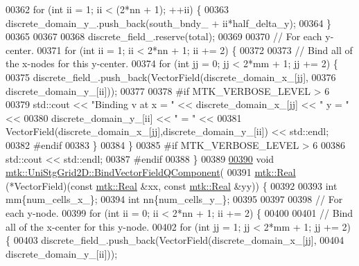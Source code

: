 \begin{DoxyCode}
00362   \textcolor{keywordflow}{for} (\textcolor{keywordtype}{int} ii = 1; ii < (2*nn + 1); ++ii) \{
00363     discrete\_domain\_y\_.push\_back(south\_bndy\_ + ii*half\_delta\_y);
00364   \}
00365 
00367 
00368   discrete\_field\_.reserve(total);
00369 
00370   \textcolor{comment}{// For each y-center.}
00371   \textcolor{keywordflow}{for} (\textcolor{keywordtype}{int} ii = 1; ii < 2*nn + 1; ii += 2) \{
00372 
00373     \textcolor{comment}{// Bind all of the x-nodes for this y-center.}
00374     \textcolor{keywordflow}{for} (\textcolor{keywordtype}{int} jj = 0; jj < 2*mm + 1; jj += 2) \{
00375       discrete\_field\_.push\_back(VectorField(discrete\_domain\_x\_[jj],
00376                                             discrete\_domain\_y\_[ii]));
00377 
00378 \textcolor{preprocessor}{      #if MTK\_VERBOSE\_LEVEL > 6}
00379       std::cout << \textcolor{stringliteral}{"Binding v at x = "} << discrete\_domain\_x\_[jj] << \textcolor{stringliteral}{" y = "} <<
00380         discrete\_domain\_y\_[ii] << \textcolor{stringliteral}{" = "} <<
00381         VectorField(discrete\_domain\_x\_[jj],discrete\_domain\_y\_[ii]) << std::endl;
00382 \textcolor{preprocessor}{      #endif}
00383     \}
00384   \}
00385 \textcolor{preprocessor}{  #if MTK\_VERBOSE\_LEVEL > 6}
00386   std::cout << std::endl;
00387 \textcolor{preprocessor}{  #endif}
00388 \}
00389 
\hypertarget{mtk__uni__stg__grid__2d_8cc_source_l00390}{}\hyperlink{classmtk_1_1UniStgGrid2D_a9643167e149da2ea4e57fd12cb9f1a97}{00390} \textcolor{keywordtype}{void} \hyperlink{classmtk_1_1UniStgGrid2D_a9643167e149da2ea4e57fd12cb9f1a97}{mtk::UniStgGrid2D::BindVectorFieldQComponent}(
00391   \hyperlink{group__c01-roots_gac080bbbf5cbb5502c9f00405f894857d}{mtk::Real} (*VectorField)(\textcolor{keyword}{const} \hyperlink{group__c01-roots_gac080bbbf5cbb5502c9f00405f894857d}{mtk::Real} &xx, \textcolor{keyword}{const} 
      \hyperlink{group__c01-roots_gac080bbbf5cbb5502c9f00405f894857d}{mtk::Real} &yy)) \{
00392 
00393   \textcolor{keywordtype}{int} mm\{num\_cells\_x\_\};
00394   \textcolor{keywordtype}{int} nn\{num\_cells\_y\_\};
00395 
00397 
00398   \textcolor{comment}{// For each y-node.}
00399   \textcolor{keywordflow}{for} (\textcolor{keywordtype}{int} ii = 0; ii < 2*nn + 1; ii += 2) \{
00400 
00401     \textcolor{comment}{// Bind all of the x-center for this y-node.}
00402     \textcolor{keywordflow}{for} (\textcolor{keywordtype}{int} jj = 1; jj < 2*mm + 1; jj += 2) \{
00403       discrete\_field\_.push\_back(VectorField(discrete\_domain\_x\_[jj],
00404                                             discrete\_domain\_y\_[ii]));

\end{DoxyCode}
